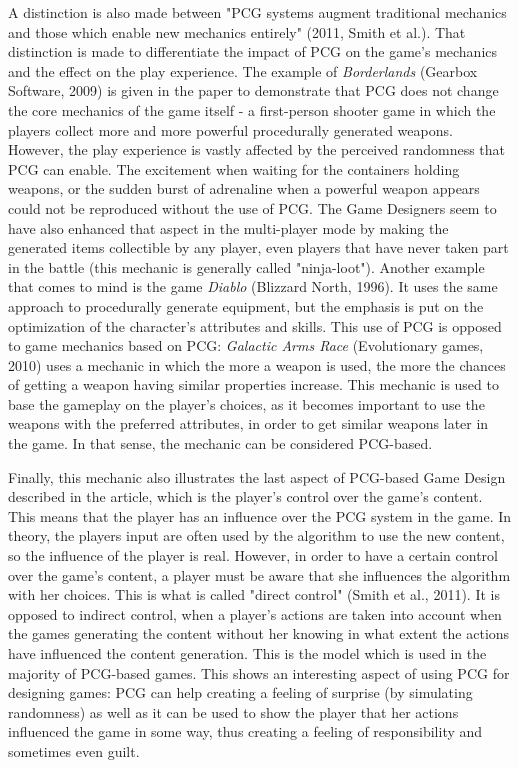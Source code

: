 A distinction is also made between "PCG systems augment traditional mechanics and those which enable new mechanics entirely" (2011, Smith et al.). That distinction is made to differentiate the impact of PCG on the game's mechanics and the effect on the play experience. The example of \textit{Borderlands} (Gearbox Software, 2009)\cite{game:border} is given in the paper to demonstrate that PCG does not change the core mechanics of the game itself - a first-person shooter game in which the players collect more and more powerful procedurally generated weapons. However, the play experience is vastly affected by the perceived randomness that PCG can enable. The excitement when waiting for the containers holding weapons, or the sudden burst of adrenaline when a powerful weapon appears could not be reproduced without the use of PCG. The Game Designers seem to have also enhanced that aspect in the multi-player mode by making the generated items collectible by any player, even players that have never taken part in the battle (this mechanic is generally called "ninja-loot"). Another example that comes to mind is the game \textit{Diablo} (Blizzard North, 1996)\cite{game:diablo}. It uses the same approach to procedurally generate equipment, but the emphasis is put on the optimization of the character's attributes and skills. This use of PCG is opposed to game mechanics based on PCG: \textit{Galactic Arms Race} (Evolutionary games, 2010)\cite{game:gar} uses a mechanic in which the more a weapon is used, the more the chances of getting a weapon having similar properties increase. This mechanic is used to base the gameplay on the player's choices, as it becomes important to use the weapons with the preferred attributes, in order to get similar weapons later in the game. In that sense, the mechanic can be considered PCG-based.

Finally, this mechanic also illustrates the last aspect of PCG-based Game Design described in the article, which is the player's control over the game's content. This means that the player has an influence over the PCG system in the game. In theory, the players input are often used by the algorithm to use the new content, so the influence of the player is real. However, in order to have a certain control over the game's content, a player must be aware that she influences the algorithm with her choices. This is what is called "direct control" (Smith et al., 2011). It is opposed to indirect control, when a player's actions are taken into account when the games generating the content without her knowing in what extent the actions have influenced the content generation. This is the model which is used in the majority of PCG-based games. This shows an interesting aspect of using PCG for designing games: PCG can help creating a feeling of surprise (by simulating randomness) as well as it can be used to show the player that her actions influenced the game in some way, thus creating a feeling of responsibility and sometimes even guilt.

